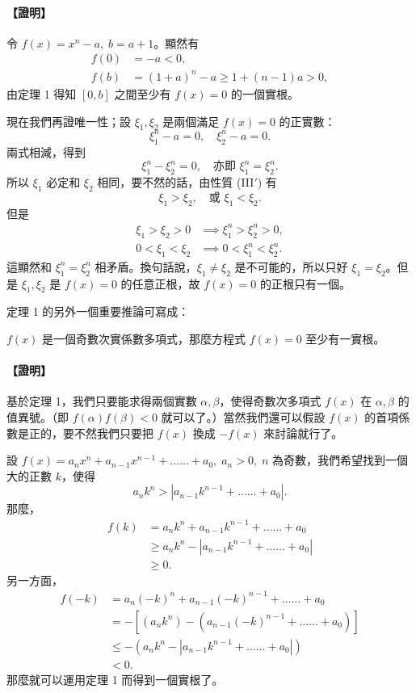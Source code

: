 \paragraph{【證明】} 令 $f(x) = x^n - a,\; b = a+1$。顯然有
\begin{align*}
f(0) &= -a < 0, \\
f(b) &= (1+a)^n - a \ge 1+(n-1)a > 0,
\end{align*}
由定理 1 得知 $[0, b]$ 之間至少有 $f(x)=0$ 的一個實根。

現在我們再證唯一性；設 $\xi_1, \xi_2$ 是兩個滿足 $f(x)=0$ 的正實數：
\[
\xi_1^n - a = 0,\quad \xi_2^n - a = 0.
\]
兩式相減，得到
\[
\xi_1^n - \xi_2^n = 0,\quad \text{亦即 } \xi_1^n = \xi_2^n.
\]
所以 $\xi_1$ 必定和 $\xi_2$ 相同，要不然的話，由性質 (III$'$) 有
\[
\xi_1 > \xi_2,\quad \text{或 } \xi_1 < \xi_2.
\]
但是
\begin{align*}
\xi_1 > \xi_2 > 0 &\implies \xi_1^n > \xi_2^n > 0, \\
0 < \xi_1 < \xi_2 &\implies 0 < \xi_1^n < \xi_2^n.
\end{align*}
這顯然和 $\xi_1^n = \xi_2^n$ 相矛盾。換句話說，$\xi_1 \neq \xi_2$ 是不可能的，所以只好 $\xi_1 = \xi_2$。但是 $\xi_1, \xi_2$ 是 $f(x)=0$ 的任意正根，故 $f(x)=0$ 的正根只有一個。

定理 1 的另外一個重要推論可寫成：

\begin{theorem}
$f(x)$ 是一個奇數次實係數多項式，那麼方程式 $f(x)=0$ 至少有一實根。
\end{theorem}
\paragraph{【證明】} 基於定理 1，我們只要能求得兩個實數 $\alpha, \beta$，使得奇數次多項式 $f(x)$ 在 $\alpha, \beta$ 的值異號。（即 $f(\alpha)f(\beta)<0$ 就可以了。）當然我們還可以假設 $f(x)$ 的首項係數是正的，要不然我們只要把 $f(x)$ 換成 $-f(x)$ 來討論就行了。

設 $f(x) = a_n x^n + a_{n-1} x^{n-1} + \dots\dots + a_0,\; a_n > 0,\; n$ 為奇數，我們希望找到一個大的正數 $k$，使得
\[
a_n k^n > |a_{n-1} k^{n-1} + \dots\dots + a_0|.
\]
那麼，
\begin{align*}
f(k) &= a_n k^n + a_{n-1} k^{n-1} + \dots\dots + a_0 \\
&\ge a_n k^n - |a_{n-1} k^{n-1} + \dots\dots + a_0| \\
&\ge 0.
\end{align*}
另一方面，
\begin{align*}
f(-k) &= a_n (-k)^n + a_{n-1} (-k)^{n-1} + \dots\dots + a_0 \\
&= -[(a_n k^n) - (a_{n-1} (-k)^{n-1} + \dots\dots + a_0)] \\
&\le -(a_n k^n - |a_{n-1} k^{n-1} + \dots\dots + a_0|) \\
&< 0.
\end{align*}
那麼就可以運用定理 1 而得到一個實根了。

